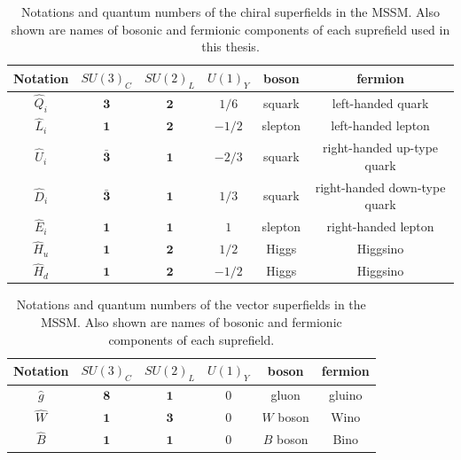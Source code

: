 \documentclass[12pt,twoside,book]{article}
\begin{document}
\begin{table}[t]
  \centering
  \begin{tabular}{c|ccc|cc}
    Notation & $SU(3)_C$ & $SU(2)_L$ & $U(1)_Y$ & boson & fermion \\ \hline
    $\hat{Q}_i$ & $\bm{3}$ & $\bm{2}$ & $1/6$ & squark & left-handed quark \\
    $\hat{L}_i$ & $\bm{1}$ & $\bm{2}$ & $-1/2$ & slepton & left-handed lepton \\
    $\hat{U}_i$ & $\bar{\bm{3}}$ & $\bm{1}$ & $-2/3$ & squark & right-handed up-type quark \\
    $\hat{D}_i$ & $\bar{\bm{3}}$ & $\bm{1}$ & $1/3$ & squark & right-handed down-type quark \\
    $\hat{E}_i$ & $\bm{1}$ & $\bm{1}$ & $1$ & slepton & right-handed lepton\\
    $\hat{H}_u$ & $\bm{1}$ & $\bm{2}$ & $1/2$ & Higgs & Higgsino\\
    $\hat{H}_d$ & $\bm{1}$ & $\bm{2}$ & $-1/2$ & Higgs & Higgsino
  \end{tabular}
  \caption{
    Notations and quantum numbers of the chiral superfields in the MSSM.
    Also shown are names of bosonic and fermionic components of each suprefield used in this thesis.
  }
  \label{tab:mssm_csf}
\end{table}

\begin{table}[t]
  \centering
  \begin{tabular}{c|ccc|cc}
    Notation & $SU(3)_C$ & $SU(2)_L$ & $U(1)_Y$ & boson & fermion \\ \hline
    $\hat{g}$ & $\bm{8}$ & $\bm{1}$ & $0$ & gluon & gluino \\
    $\hat{W}$ & $\bm{1}$ & $\bm{3}$ & $0$ & $W$ boson & Wino\\
    $\hat{B}$ & $\bm{1}$ & $\bm{1}$ & $0$ & $B$ boson & Bino\\
  \end{tabular}
  \caption{
    Notations and quantum numbers of the vector superfields in the MSSM.
    Also shown are names of bosonic and fermionic components of each suprefield.}
  \label{tab:mssm_vsf}
\end{table}
\end{document}
